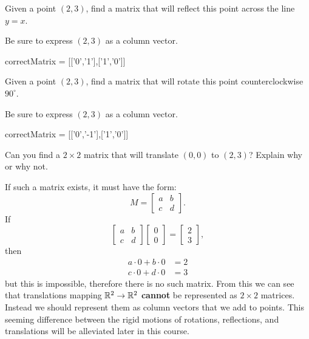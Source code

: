 \documentclass{ximera}
\begin{document}
\begin{question}
Given a point $(2,3)$, find a matrix that will reflect this point
across the line $y=x$.
\begin{solution}
  \begin{hint}
    Be sure to express $(2,3)$ as a column vector.
  \end{hint}
  \begin{matrixAnswer}[name=M]
    correctMatrix = [['0','1'],['1','0']]
\end{matrixAnswer}
\end{solution}
Given a point $(2,3)$, find a matrix that will rotate this point
counterclockwise $90^\circ$.
\begin{solution}
  \begin{hint}
    Be sure to express $(2,3)$ as a column vector.
  \end{hint}
  \begin{matrixAnswer}[name=M]
    correctMatrix = [['0','-1'],['1','0']]
\end{matrixAnswer}
\end{solution}
Can you find a $2\times 2$ matrix that will translate $(0,0)$ to
$(2,3)$? Explain why or why not.
\begin{solution}
\begin{freeResponse}
If such a matrix exists, it must have the form:
\[
M = 
\begin{bmatrix}
a & b \\
c & d
\end{bmatrix}.
\]
If 
\[
\begin{bmatrix}
a & b \\
c & d
\end{bmatrix}
\begin{bmatrix}
0 \\
0 
\end{bmatrix} = 
\begin{bmatrix}
2 \\
3
\end{bmatrix},
\]
then 
\begin{align*}
a\cdot 0 + b\cdot 0 &= 2\\
c\cdot 0 + d\cdot 0 &= 3
\end{align*}
but this is impossible, therefore there is no such matrix. From this
we can see that translations mapping $\mathbb R^2\to \mathbb R^2$ \textbf{cannot} be
represented as $2\times 2$ matrices. Instead we should represent them
as column vectors that we add to points. This seeming difference
between the rigid motions of rotations, reflections, and translations
will be alleviated later in this course.
\end{freeResponse}
\end{solution}
\end{question}
\end{document}
